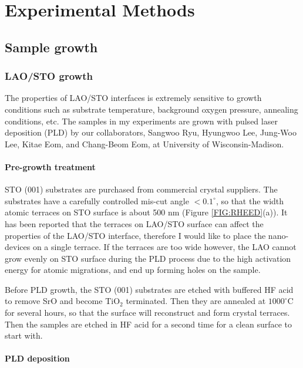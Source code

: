 \documentclass[pdflatex, sectionletters, 12pt]{pittetd}    %
\begin{document}
\chapter{Experimental Methods}
\label{SEC:methods}

\section{Sample growth}

\subsection{LAO/STO growth}
The properties of LAO/STO interfaces is extremely sensitive to growth conditions such as substrate temperature, background oxygen pressure, annealing conditions, etc\cite{cancellieri2010influence}. The samples in my experiments are grown with pulsed laser deposition (PLD) by our collaborators, Sangwoo Ryu, Hyungwoo Lee, Jung-Woo Lee, Kitae Eom, and Chang-Beom Eom, at University of Wisconsin-Madison.

\subsubsection{Pre-growth treatment}

STO (001) substrates are purchased from commercial crystal suppliers. The substrates have a carefully controlled mis-cut angle $< 0.1^{\circ}$, so that the width atomic terraces on STO surface is about 500 nm (Figure \ref{FIG:RHEED}(a)). It has been reported that the terraces on LAO/STO surface can affect the properties of the LAO/STO interface\cite{fix2011influence}, therefore I would like to place the nano-devices on a single terrace. If the terraces are too wide however, the LAO cannot grow evenly on STO surface during the PLD process due to the high activation energy for atomic migrations, and end up forming holes on the sample. 

Before PLD growth, the STO (001) substrates are etched with buffered HF acid to remove SrO and become TiO$_2$ terminated. Then they are annealed at $1000^{\circ}$C for several hours, so that the surface will reconstruct and form crystal terraces\cite{radovic2008low}. Then the samples are etched in HF acid for a second time for a clean surface to start with. 

\subsubsection{PLD deposition}
\end{document}
